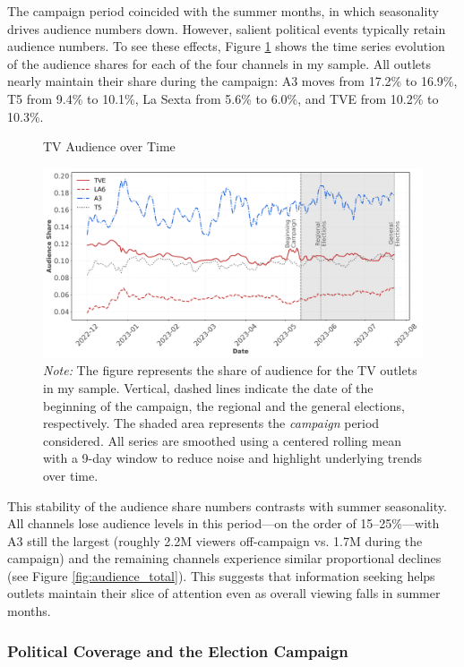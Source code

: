 \documentclass[12pt]{article}
\begin{document}
	
	The campaign period coincided with the summer months, in which seasonality drives audience numbers down. However, salient political events typically retain audience numbers. To see these effects, 	Figure \ref{fig:audience_share} shows the time series evolution of the audience shares for each of the four channels in my sample. All outlets nearly maintain their share during the campaign: A3 moves from 17.2\% to 16.9\%, T5 from 9.4\% to 10.1\%, La Sexta from 5.6\% to 6.0\%, and TVE from 10.2\% to 10.3\%. 
	
	
	\begin{figure}[!htbp]
		\caption{TV Audience over Time}
		\centering
		\includegraphics[width=150mm]{figures/tv_audience_sharev2}
		\caption*{\small \textit{Note:} The figure represents the share of audience for the TV outlets in my sample.  Vertical, dashed lines indicate the date of the beginning of the campaign, the regional and the general elections, respectively. The shaded area represents the \textit{campaign} period considered.  All series are smoothed using a centered rolling mean with a 9-day window to reduce noise and highlight underlying trends over time.}
		\label{fig:audience_share}
	\end{figure}
	
	
	
	This stability of the audience share numbers contrasts with summer seasonality. All channels lose audience levels in this period—on the order of 15–25\%—with A3 still the largest (roughly 2.2M viewers off-campaign vs. 1.7M during the campaign) and the remaining channels experience similar proportional declines (see Figure  \ref{fig:audience_total}). This  suggests that information seeking  helps outlets maintain their slice of attention even as overall viewing falls in summer months. 
	
	
	
	\subsubsection*{Political Coverage and the Election Campaign}
	
\end{document}
